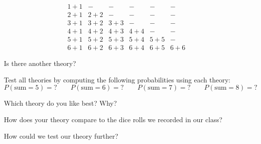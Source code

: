 \[
\begin{array}{cccccc}
1+1 & - & - & - & - & - \\
2+1 & 2+2 & - & - & - & - \\
3+1 & 3+2 & 3+3 & - & - & - \\
4+1 & 4+2 & 4+3 & 4+4 & - & - \\
5+1 & 5+2 & 5+3 & 5+4 & 5+5 & - \\
6+1 & 6+2 & 6+3 & 6+4 & 6+5 & 6+6 
\end{array}
\]

\begin{prob}
Is there another theory?
\end{prob}

\begin{prob}
Test all theories by computing the following probabilities using
  each theory:
\[
P(\text{sum}=5)=? \qquad P(\text{sum}=6)=? \qquad P(\text{sum}=7)=?
\qquad P(\text{sum}=8)=?
\]
\end{prob}

\begin{prob}
Which theory do you like best?  Why?
\end{prob}

\begin{prob}
How does your theory compare to the dice rolls we recorded in
  our class?
\end{prob}

\begin{prob}
 How could we test our theory further?
\end{prob}



